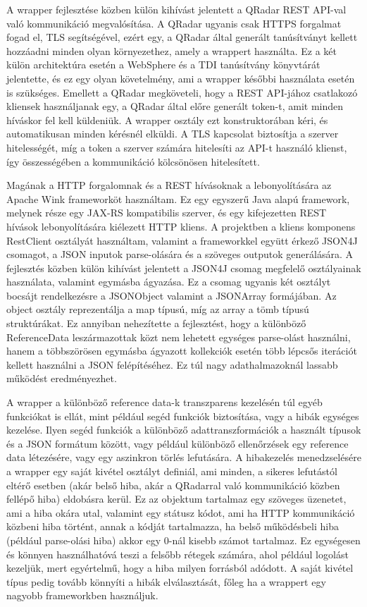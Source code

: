 A wrapper fejlesztése közben külön kihívást jelentett a QRadar REST API-val való kommunikáció megvalósítása. A QRadar ugyanis csak HTTPS forgalmat fogad el, TLS segítségével, ezért egy, a QRadar által generált tanúsítványt kellett hozzáadni minden olyan környezethez, amely a wrappert használta. Ez a két külön architektúra esetén a WebSphere és a TDI tanúsítvány könyvtárát jelentette, és ez egy olyan követelmény, ami a wrapper későbbi használata esetén is szükséges. Emellett a QRadar megköveteli, hogy a REST API-jához csatlakozó kliensek használjanak egy, a QRadar által előre generált token-t, amit minden híváskor fel kell küldeniük. A wrapper osztály ezt konstruktorában kéri, és automatikusan minden kérésnél elküldi. A TLS kapcsolat biztosítja a szerver hitelességét, míg a token a szerver számára hitelesíti az API-t használó klienst, így összességében a kommunikáció kölcsönösen hitelesített.

Magának a HTTP forgalomnak és a REST hívásoknak a lebonyolítására az Apache Wink\cite{wink} frameworköt használtam. Ez egy egyszerű Java alapú framework, melynek része egy JAX-RS kompatibilis szerver, és egy kifejezetten REST hívások lebonyolítására kiélezett HTTP kliens. A projektben a kliens komponens RestClient osztályát használtam, valamint a frameworkkel együtt érkező JSON4J csomagot, a JSON inputok parse-olására és a szöveges outputok generálására. A fejlesztés közben külön kihívást jelentett a JSON4J csomag megfelelő osztályainak használata, valamint egymásba ágyazása. Ez a csomag ugyanis két osztályt bocsájt rendelkezésre a JSONObject valamint a JSONArray formájában. Az object osztály reprezentálja a map típusú, míg az array a tömb típusú struktúrákat. Ez annyiban nehezítette a fejlesztést, hogy a különböző ReferenceData leszármazottak közt nem lehetett egységes parse-olást használni, hanem a többszörösen egymásba ágyazott kollekciók esetén több lépcsős iterációt kellett használni a JSON felépítéséhez. Ez túl nagy adathalmazoknál lassabb működést eredményezhet.

A wrapper a különböző reference data-k transzparens kezelésén túl egyéb funkciókat is ellát, mint például segéd funkciók biztosítása, vagy a hibák egységes kezelése. Ilyen segéd funkciók a különböző adattranszformációk a használt típusok és a JSON formátum között, vagy például különböző ellenőrzések egy reference data létezésére, vagy egy aszinkron törlés lefutására. A hibakezelés menedzselésére a wrapper egy saját kivétel osztályt definiál, ami minden, a sikeres lefutástól eltérő esetben (akár belső hiba, akár a QRadarral való kommunikáció közben fellépő hiba) eldobásra kerül. Ez az objektum tartalmaz egy szöveges üzenetet, ami a hiba okára utal, valamint egy státusz kódot, ami ha HTTP kommunikáció közbeni hiba történt, annak a kódját tartalmazza, ha belső működésbeli hiba (például parse-olási hiba) akkor egy 0-nál kisebb számot tartalmaz. Ez egységesen és könnyen használhatóvá teszi a felsőbb rétegek számára, ahol például logolást kezeljük, mert egyértelmű, hogy a hiba milyen forrásból adódott. A saját kivétel típus pedig tovább könnyíti a hibák elválasztását, főleg ha a wrappert egy nagyobb frameworkben használjuk.

